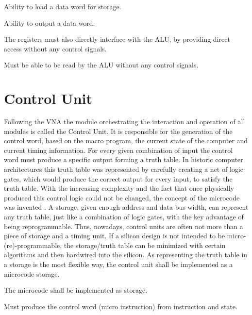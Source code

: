 \begin{feat-requirement}
  Ability to load a data word for storage.
\end{feat-requirement}

\begin{feat-requirement}
  Ability to output a data word.
\end{feat-requirement}

The registers must also directly interface with the ALU, by providing direct access without any control signals. 

\begin{arch-requirement} \label{req:register-direct-access}
  Must be able to be read by the ALU without any control signals.
\end{arch-requirement}


\section{Control Unit}
Following the VNA the module orchestrating the interaction and operation of all modules is called the Control Unit. It is responsible for the generation of the control word, based on the macro program, the current state of the computer and current timing information. For every given combination of input the control word must produce a specific output forming a truth table. In historic computer architectures this truth table was represented by carefully creating a net of logic gates, which would produce the correct output for every input, to satisfy the truth table. With the increasing complexity and the fact that once physically produced this control logic could not be changed, the concept of the microcode was invented \cite{cite.needed}. A storage, given enough address and data bus width, can represent any truth table, just like a combination of logic gates, with the key advantage of being reprogrammable. Thus, nowadays, control units are often not more than a piece of storage and a timing unit. If a silicon design is not intended to be micro-(re)-programmable, the storage/truth table can be minimized with certain algorithms and then hardwired into the silicon. As representing the truth table in a storage is the most flexible way, the control unit shall be implemented as a microcode storage.

\begin{arch-requirement}
  The microcode shall be implemented as storage.
\end{arch-requirement}

\begin{arch-requirement}
  Must produce the control word (micro instruction) from instruction and state.
\end{arch-requirement}

